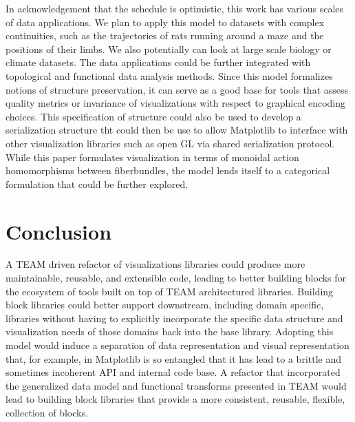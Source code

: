 \documentclass[../main.tex]{subfiles}
\begin{document}
In acknowledgement that the schedule is optimistic, this work has various scales of data applications. We plan to apply this model to datasets with complex continuities, such as the trajectories of rats running around a maze and the positions of their limbs. We also potentially can look at large scale biology or climate datasets. The data applications could be further integrated with topological\cite{heineSurveyTopologybasedMethods2016} and functional \cite{ramsayFunctionalDataAnalysis2006a} data analysis methods. Since this model formalizes notions of structure preservation, it can serve as a good base for tools that assess quality metrics\cite{bertiniQualityMetricsHighdimensional2011a} or invariance \cite{kindlmannAlgebraicProcessVisualization2014} of visualizations with respect to graphical encoding choices. This specification of structure could also be used to develop a serialization structure tht could then be use to allow Matplotlib to interface with other visualization libraries such as open GL via shared serialization protocol. While this paper formulates visualization in terms of monoidal action homomorphisms between fiberbundles, the model lends itself to a categorical formulation\cite{fongInvitationAppliedCategory2019,milewskiCategoryTheoryProgrammers} that could be further explored.  

\section{Conclusion}
A TEAM driven refactor of visualizations libraries could produce more maintainable, reusable, and extensible code, leading to better building blocks for the ecosystem of tools built on top of TEAM architectured libraries. Building block libraries could better support downstream, including domain specific, libraries without having to explicitly incorporate the specific data structure and visualization needs of those domains back into the base library. Adopting this model would induce a separation of data representation and visual representation that, for example, in Matplotlib is so entangled that it has lead to a brittle and sometimes incoherent API and internal code base. A refactor that incorporated the generalized data model and functional transforms presented in TEAM would lead to building block libraries that provide a more consistent, reusable, flexible, collection of blocks. 
\end{document}
